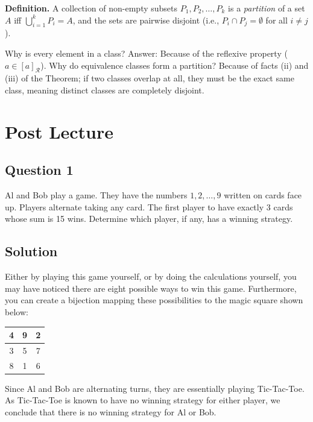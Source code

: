 \documentclass{article}
\begin{document}
    \vspace{1.5mm}
    \textbf{Definition.} A collection of non-empty subsets $P_1, P_2, \dots, P_k$ is a \textit{partition} of a set $A$ iff $\bigcup_{i = 1}^{k} P_{i} = A$, and the sets are pairwise disjoint (i.e., $P_i \cap P_j = \emptyset$ for all $i \neq j$).
    
    Why is every element in a class? Answer: Because of the reflexive property ($a \in [a]_{\mathcal{R}}$). Why do equivalence classes form a partition? Because of facts (ii) and (iii) of the Theorem; if two classes overlap at all, they must be the exact same class, meaning distinct classes are completely disjoint.

\section*{Post Lecture}

\subsection*{Question 1}
    Al and Bob play a game. They have the numbers $1,2,\dots, 9$ written on cards face up. Players alternate taking any card. The first player to have exactly 3 cards whose sum is 15 wins. Determine which player, if any, has a winning strategy.
    

\subsection*{Solution}
    Either by playing this game yourself, or by doing the calculations yourself, you may have noticed there are eight possible ways to win this game. Furthermore, you can create a bijection mapping these possibilities to the magic square shown below:
    \begin{center}
        \begin{tabular}{c|c|c}
            4 & 9 & 2 \\
             \hline
            3 & 5 & 7 \\
             \hline
            8 & 1 & 6
        \end{tabular}
    \end{center}
    Since Al and Bob are alternating turns, they are essentially playing Tic-Tac-Toe. As Tic-Tac-Toe is known to have no winning strategy for either player, we conclude that there is no winning strategy for Al or Bob.
\end{document}
